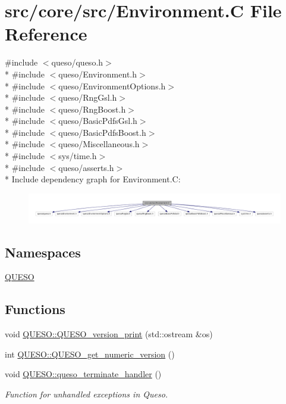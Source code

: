 \hypertarget{_environment_8_c}{\section{src/core/src/\-Environment.C File Reference}
\label{_environment_8_c}
}
{\ttfamily \#include $<$queso/queso.\-h$>$}\\*
{\ttfamily \#include $<$queso/\-Environment.\-h$>$}\\*
{\ttfamily \#include $<$queso/\-Environment\-Options.\-h$>$}\\*
{\ttfamily \#include $<$queso/\-Rng\-Gsl.\-h$>$}\\*
{\ttfamily \#include $<$queso/\-Rng\-Boost.\-h$>$}\\*
{\ttfamily \#include $<$queso/\-Basic\-Pdfs\-Gsl.\-h$>$}\\*
{\ttfamily \#include $<$queso/\-Basic\-Pdfs\-Boost.\-h$>$}\\*
{\ttfamily \#include $<$queso/\-Miscellaneous.\-h$>$}\\*
{\ttfamily \#include $<$sys/time.\-h$>$}\\*
{\ttfamily \#include $<$queso/asserts.\-h$>$}\\*
Include dependency graph for Environment.\-C\-:
\nopagebreak
\begin{figure}[H]
\begin{center}
\leavevmode
\includegraphics[width=350pt]{_environment_8_c__incl}
\end{center}
\end{figure}
\subsection*{Namespaces}
\begin{DoxyCompactItemize}
\item 
\hyperlink{namespace_q_u_e_s_o}{Q\-U\-E\-S\-O}
\end{DoxyCompactItemize}
\subsection*{Functions}
\begin{DoxyCompactItemize}
\item 
void \hyperlink{namespace_q_u_e_s_o_ae2e4805bfcc226b2ceb17c8a8dbb1297}{Q\-U\-E\-S\-O\-::\-Q\-U\-E\-S\-O\-\_\-version\-\_\-print} (std\-::ostream \&os)
\item 
int \hyperlink{namespace_q_u_e_s_o_a61ed284ac8a5002856025bf21955b215}{Q\-U\-E\-S\-O\-::\-Q\-U\-E\-S\-O\-\_\-get\-\_\-numeric\-\_\-version} ()
\item 
void \hyperlink{namespace_q_u_e_s_o_a97e263e01a0ff9fad14de6a8840b007e}{Q\-U\-E\-S\-O\-::queso\-\_\-terminate\-\_\-handler} ()
\begin{DoxyCompactList}\small\item\em Function for unhandled exceptions in Queso. \end{DoxyCompactList}\end{DoxyCompactItemize}
